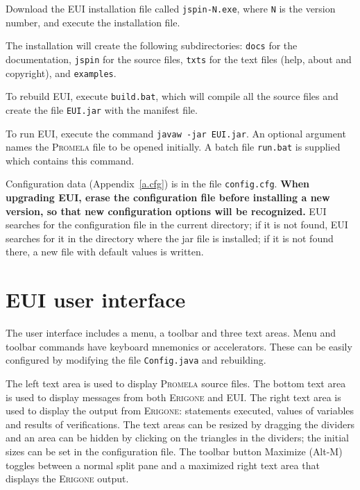 \documentclass[11pt]{article}
\newcommand{\eri}{\textsc{Erigone}}
\newcommand{\prm}{\textsc{Promela}}
\newcommand{\eui}{\textsc{EUI}}
\newcommand{\p}[1]{\texttt{#1}}
\newcommand{\bu}[1]{\textsf{#1}}
\begin{document}
Download the \eui{} installation file called \p{jspin-N.exe},
where \p{N} is the version number, and execute the installation file.

The installation will create the following subdirectories: \p{docs} for the
documentation, \p{jspin} for the source files, 
\p{txts} for the text files
(help, about and copyright), and \p{examples}.

To rebuild \eui{}, execute \p{build.bat}, which will compile all the source
files and create the file \p{EUI.jar} with the manifest file.

To run \eui{}, execute the command \p{javaw -jar EUI.jar}.
An optional argument names the \prm{} file to be opened initially.
A batch file \p{run.bat} is supplied which contains this command.

Configuration data (Appendix~\ref{a.cfg}) is in the file
\p{config.cfg}.
\textbf{When upgrading \eui{}, erase the configuration file before installing
a new version, so that new configuration options will be recognized.}
\eui{} searches for the configuration file in the current
directory; if it is not found, \eui{} searches for it in the directory
where the jar file is installed; if it is not found there, a new file
with default values is written.

\section{\eui{} user interface}
The user interface includes a menu, a toolbar and three text areas.
Menu and toolbar commands have keyboard mnemonics or accelerators.
These can be easily configured by modifying the file \p{Config.java} and
rebuilding.

The left text area is used to display \prm{} source files. The bottom
text area is used to display messages from both \eri{} and \eui{}. The
right text area is used to display the output from \eri{}: statements
executed, values of variables and results of verifications. The text
areas can be resized by dragging the dividers and an area can be hidden
by clicking on the triangles in the dividers; the initial sizes can be
set in the configuration file. The toolbar button \bu{Maximize}
(\bu{Alt-M}) toggles between a normal split pane and a maximized right
text area that displays the \eri{} output.
\end{document}
